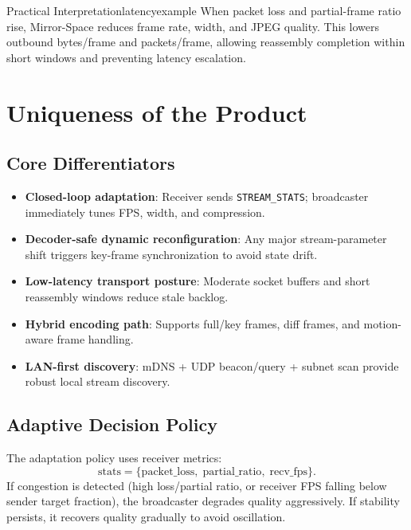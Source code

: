 \documentclass[12pt,a4paper]{article}
\begin{document}
\begin{example}{Practical Interpretation}{latencyexample}
When packet loss and partial-frame ratio rise, Mirror-Space reduces frame rate, width, and JPEG quality. This lowers outbound bytes/frame and packets/frame, allowing reassembly completion within short windows and preventing latency escalation.
\end{example}

\newpage

\section{Uniqueness of the Product}

\subsection{Core Differentiators}
\begin{itemize}[leftmargin=*, itemsep=4pt]
  \item \textbf{Closed-loop adaptation}: Receiver sends \texttt{STREAM\_STATS}; broadcaster immediately tunes FPS, width, and compression.
  \item \textbf{Decoder-safe dynamic reconfiguration}: Any major stream-parameter shift triggers key-frame synchronization to avoid state drift.
  \item \textbf{Low-latency transport posture}: Moderate socket buffers and short reassembly windows reduce stale backlog.
  \item \textbf{Hybrid encoding path}: Supports full/key frames, diff frames, and motion-aware frame handling.
  \item \textbf{LAN-first discovery}: mDNS + UDP beacon/query + subnet scan provide robust local stream discovery.
\end{itemize}

\subsection{Adaptive Decision Policy}
The adaptation policy uses receiver metrics:
\[
\text{stats} = \{\text{packet\_loss},\;\text{partial\_ratio},\;\text{recv\_fps}\}.
\]
If congestion is detected (high loss/partial ratio, or receiver FPS falling below sender target fraction), the broadcaster degrades quality aggressively. If stability persists, it recovers quality gradually to avoid oscillation.
\end{document}
